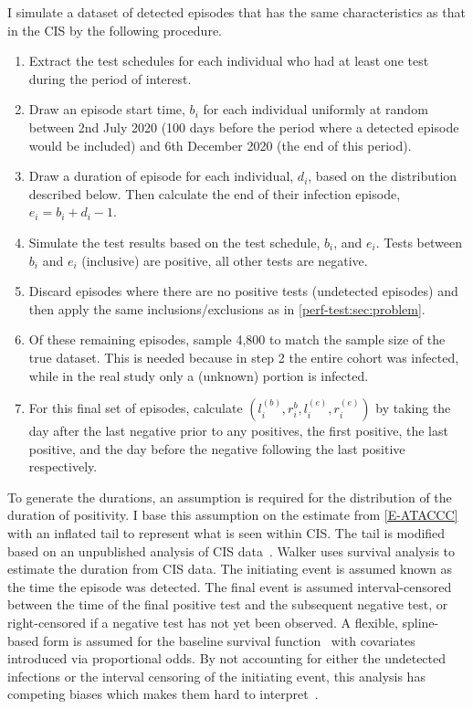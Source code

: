 \documentclass[thesis.tex]{subfiles}
\begin{document}
I simulate a dataset of detected episodes that has the same characteristics as that in the CIS by the following procedure.
\begin{enumerate}
    \item Extract the test schedules for each individual who had at least one test during the period of interest.
    \item Draw an episode start time, $b_i$ for each individual uniformly at random between 2nd July 2020 (100 days before the period where a detected episode would be included) and 6th December 2020 (the end of this period).
    \item Draw a duration of episode for each individual, $d_i$, based on the distribution described below. Then calculate the end of their infection episode, $e_i = b_i + d_i - 1$.
    \item Simulate the test results based on the test schedule, $b_i$, and $e_i$. Tests between $b_i$ and $e_i$ (inclusive) are positive, all other tests are negative.
    \item Discard episodes where there are no positive tests (\ie undetected episodes) and then apply the same inclusions/exclusions as in \cref{perf-test:sec:problem}.
    \item Of these remaining episodes, sample 4,800 to match the sample size of the true dataset. This is needed because in step 2 the entire cohort was infected, while in the real study only a (unknown) portion is infected.
    \item For this final set of episodes, calculate $(l_i^{(b)}, r_i^{b}, l_i^{(e)}, r_i^{(e)})$ by taking the day after the last negative prior to any positives, the first positive, the last positive, and the day before the negative following the last positive respectively.
\end{enumerate}

To generate the durations, an assumption is required for the distribution of the duration of positivity.
I base this assumption on the estimate from \cref{E-ATACCC} with an inflated tail to represent what is seen within CIS.
The tail is modified based on an unpublished analysis of CIS data~.
Walker uses survival analysis to estimate the duration from CIS data.
The initiating event is assumed known as the time the episode was detected.
The final event is assumed interval-censored between the time of the final positive test and the subsequent negative test, or right-censored if a negative test has not yet been observed.
A flexible, spline-based form is assumed for the baseline survival function~\autocite{roystonSTPM,roystonFlexible} with covariates introduced via proportional odds.
By not accounting for either the undetected infections or the interval censoring of the initiating event, this analysis has competing biases which makes them hard to interpret~\autocite{cisMethodsONS}.
\end{document}
